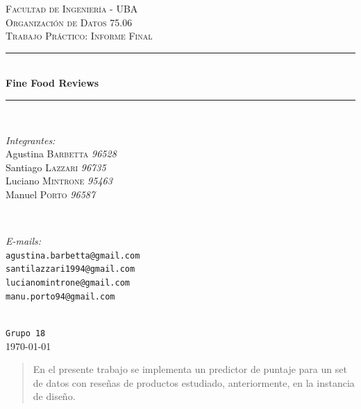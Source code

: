 \documentclass[10pt,a4paper]{article}
\begin{document}
\begin{titlepage}

\newcommand{\HRule}{\rule{\linewidth}{0.5mm}} %

\center %

\textsc{\LARGE Facultad de Ingeniería - UBA}\\[1.5cm]
\textsc{\Large Organización de Datos 75.06}\\[0.5cm]
\textsc{\large Trabajo Práctico: Informe Final}\\[0.5cm]

\HRule \\[0.4cm]
{ \huge \bfseries Fine Food Reviews}\\[0.4cm]
\HRule \\[1.5cm]

\begin{minipage}{0.5\textwidth}
\begin{flushleft} \large
\emph{Integrantes:}\\
Agustina \textsc{Barbetta} \textit{96528}\\
Santiago \textsc{Lazzari} \textit{96735}\\
Luciano \textsc{Mintrone} \textit{95463}\\
Manuel \textsc{Porto} \textit{96587}\\
\end{flushleft}
\end{minipage}
~
\begin{minipage}{0.4\textwidth}
\begin{flushright} \large
\emph{E-mails:}\\
\texttt{agustina.barbetta@gmail.com}\\
\texttt{santilazzari1994@gmail.com}\\
\texttt{lucianomintrone@gmail.com}\\
\texttt{manu.porto94@gmail.com}\\
\end{flushright}
\end{minipage}\\[2cm]

{\Large \texttt{Grupo 18}}\\[2cm]

{\large \today}\\[3cm]

\begin{abstract}
En el presente trabajo se implementa un predictor de puntaje para un set de datos con reseñas de productos estudiado, anteriormente, en la instancia de diseño.
\end{abstract}

\vfill

\end{titlepage}
\end{document}
